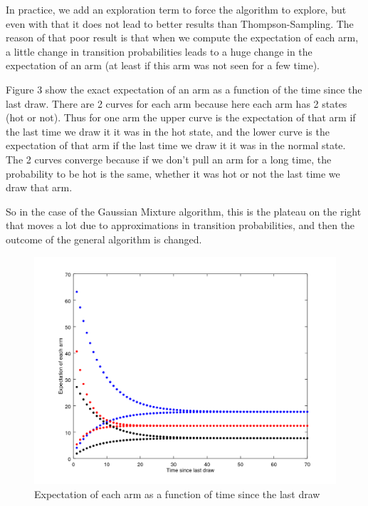 \documentclass{article} %
\begin{document}
In practice, we add an exploration term to force the algorithm to explore, but even with that it does not lead to better results than Thompson-Sampling. The reason of that poor result is that when we compute the expectation of each arm, a little change in transition probabilities leads to a huge change in the expectation of an arm (at least if this arm was not seen for a few time). 

Figure 3 show the exact expectation of an arm as a function of the time since the last draw. There are 2 curves for each arm because here each arm has 2 states (hot or not). Thus for one arm the upper curve is the expectation of that arm if the last time we draw it it was in the hot state, and the lower curve is the expectation of that arm if the last time we draw it it was in the normal state. The 2 curves converge because if we don't pull an arm for a long time, the probability to be hot is the same, whether it was hot or not the last time we draw that arm.

So in the case of the Gaussian Mixture algorithm, this is the plateau on the right that moves a lot due to approximations in transition probabilities, and then the outcome of the general algorithm is changed.

\begin{figure}[h]
	\begin{center}
		\includegraphics[width=1.0\textwidth]{expectations.png}
	\end{center}
	\caption{Expectation of each arm as a function of time since the last draw}
\end{figure}
\end{document}
